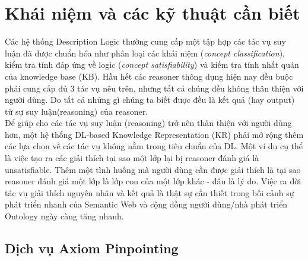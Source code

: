 \section{Khái niệm và các kỹ thuật cần biết}
\hspace*{0.05\textwidth} Các hệ thống Description Logic thường cung cấp một tập hợp các tác vụ suy luận đã được chuẩn hóa như phân loại các khái niệm (\textit{concept classification}), kiểm tra tính đáp ứng về logic (\textit{concept satisfiability}) và kiếm tra tính nhất quán của knowledge base (KB). Hầu hết các reasoner thông dụng hiện nay đều buộc phải cung cấp đủ 3 tác vụ nêu trên, nhưng tất cả chúng đều không thân thiện với người dùng. Do tất cả những gì chúng ta biết được đều là kết quả (hay output) từ sự suy luận(reasoning) của reasoner. 
\\
\hspace*{0.05\textwidth}  Để giúp cho các tác vụ suy luận (reasoning) trở nên thân thiện với người dùng hơn, một hệ thống DL-based Knowledge Representation (KR) phải mở rộng thêm các lựa chọn về các tác vụ không nằm trong tiêu chuẩn của DL. Một ví dụ cụ thể là việc tạo ra các giải thích tại sao một lớp lại bị reasoner đánh giá là unsatisfiable. Thêm một tình huống mà người dùng cần được giải thích là tại sao reasoner đánh giá một lớp là lớp con của một lớp khác - đâu là lý do. Việc ra đời tác vụ giải thích nguyên nhân và kết quả là thật sự cần thiết trong bối cảnh sự phát triển nhanh của Semantic Web và cộng đồng người dùng/nhà phát triển Ontology ngày càng tăng nhanh.
\subsection{Dịch vụ Axiom Pinpointing}
